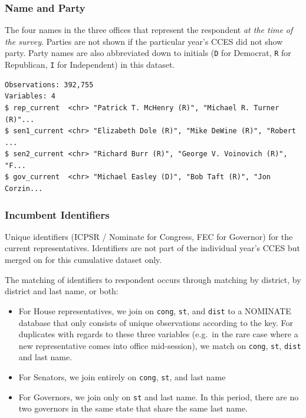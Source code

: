 \documentclass[10pt,article,oneside]{memoir}
\theoremstyle{definition}
\begin{document}
\hypertarget{name-and-party}{%
\subsubsection{Name and Party}\label{name-and-party}}

The four names in the three offices that represent the respondent
\emph{at the time of the survey}. Parties are not shown if the
particular year's CCES did not show party. Party names are also
abbreviated down to initials (\texttt{D} for Democrat, \texttt{R} for
Republican, \texttt{I} for Independent) in this dataset.

\begin{verbatim}
Observations: 392,755
Variables: 4
$ rep_current  <chr> "Patrick T. McHenry (R)", "Michael R. Turner (R)"...
$ sen1_current <chr> "Elizabeth Dole (R)", "Mike DeWine (R)", "Robert ...
$ sen2_current <chr> "Richard Burr (R)", "George V. Voinovich (R)", "F...
$ gov_current  <chr> "Michael Easley (D)", "Bob Taft (R)", "Jon Corzin...
\end{verbatim}

\hypertarget{incumbent-identifiers}{%
\subsubsection{Incumbent Identifiers}\label{incumbent-identifiers}}

Unique identifiers (ICPSR / Nominate for Congress, FEC for Governor) for
the current representatives. Identifiers are not part of the individual
year's CCES but merged on for this cumulative dataset only.

The matching of identifiers to respondent occurs through matching by
district, by district and last name, or both:

\begin{itemize}
\tightlist
\item
  For House representatives, we join on \texttt{cong}, \texttt{st}, and
  \texttt{dist} to a NOMINATE database that only consists of unique
  observations according to the key. For duplicates with regards to
  these three variables (e.g.~in the rare case where a new
  representative comes into office mid-session), we match on
  \texttt{cong}, \texttt{st}, \texttt{dist} and last name.
\item
  For Senators, we join entirely on \texttt{cong}, \texttt{st}, and last
  name
\item
  For Governors, we join only on \texttt{st} and last name. In this
  period, there are no two governors in the same state that share the
  same last name.
\end{itemize}
\end{document}
